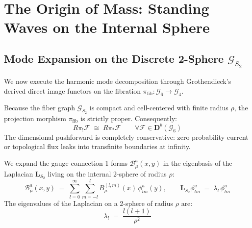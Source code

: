 \documentclass[
    12pt,
    a4paper,
    headings=normal,
    twoside=false,
    open=any,
    parskip=half
]{scrbook}
\begin{document}
\section{The Origin of Mass: Standing Waves on the Internal Sphere}
\label{sec:ch2_topological_mass_generation}

\subsection{Mode Expansion on the Discrete 2-Sphere $\mathcal{G}_{S_2}$}

We now execute the harmonic mode decomposition through Grothendieck's derived direct image functors on the fibration $\pi_{\text{fib}} \colon \mathcal{G}_6 \to \mathcal{G}_4$.

\begin{phystheorem}
Because the fiber graph $\mathcal{G}_{S_2}$ is compact and cell-centered with finite radius $\rho$, the projection morphism $\pi_{\text{fib}}$ is strictly proper. Consequently:
\begin{equation}
R\pi_! \mathscr{F} \;\cong\; R\pi_* \mathscr{F} \qquad \forall \mathscr{F} \in \mathbf{D}^b(\mathcal{G}_6)
\end{equation}
The dimensional pushforward is completely conservative: zero probability current or topological flux leaks into transfinite boundaries at infinity.
\end{phystheorem}

We expand the gauge connection 1-forms $\mathcal{B}_\mu^a(x, y)$ in the eigenbasis of the Laplacian $\mathbf{L}_{S_2}$ living on the internal 2-sphere of radius $\rho$:
\begin{equation}
\mathcal{B}_\mu^a(x, y) \;=\; \sum_{l=0}^\infty \sum_{m=-l}^l B_\mu^{(l, m)}(x) \, \phi_{lm}^a(y), \qquad \mathbf{L}_{S_2} \phi_{lm}^a \;=\; \lambda_l \, \phi_{lm}^a
\label{eq:ch2_mode_expansion}
\end{equation}
The eigenvalues of the Laplacian on a 2-sphere of radius $\rho$ are:
\begin{equation}
\lambda_l \;=\; \frac{l(l+1)}{\rho^2}
\label{eq:ch2_spherical_eigenvalues}
\end{equation}
\end{document}
